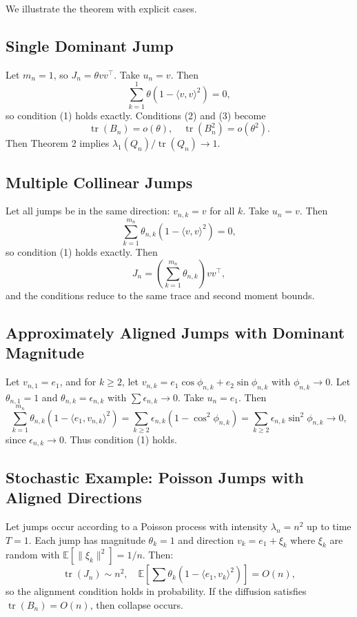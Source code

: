 \documentclass{article}
\begin{document}
We illustrate the theorem with explicit cases.

\subsection{Single Dominant Jump}

Let \(m_n = 1\), so \(J_n = \theta v v^\top\). Take \(u_n = v\). Then
\[
\sum_{k=1}^{1} \theta (1 - \langle v, v \rangle^2) = 0,
\]
so condition (1) holds exactly. Conditions (2) and (3) become
\[
\operatorname{tr}(B_n) = o(\theta), \quad \operatorname{tr}(B_n^2) = o(\theta^2).
\]
Then Theorem 2 implies \(\lambda_1(Q_n)/\operatorname{tr}(Q_n) \to 1\).

\subsection{Multiple Collinear Jumps}

Let all jumps be in the same direction: \(v_{n,k} = v\) for all \(k\). Take \(u_n = v\). Then
\[
\sum_{k=1}^{m_n} \theta_{n,k} (1 - \langle v, v \rangle^2) = 0,
\]
so condition (1) holds exactly. Then
\[
J_n = \left(\sum_{k=1}^{m_n} \theta_{n,k}\right) v v^\top,
\]
and the conditions reduce to the same trace and second moment bounds.

\subsection{Approximately Aligned Jumps with Dominant Magnitude}

Let \(v_{n,1} = e_1\), and for \(k \ge 2\), let \(v_{n,k} = e_1 \cos \phi_{n,k} + e_2 \sin \phi_{n,k}\) with \(\phi_{n,k} \to 0\). Let \(\theta_{n,1} = 1\) and \(\theta_{n,k} = \epsilon_{n,k}\) with \(\sum \epsilon_{n,k} \to 0\). Take \(u_n = e_1\). Then
\[
\sum_{k=1}^{m_n} \theta_{n,k} (1 - \langle e_1, v_{n,k} \rangle^2) = \sum_{k \ge 2} \epsilon_{n,k} (1 - \cos^2 \phi_{n,k}) = \sum_{k \ge 2} \epsilon_{n,k} \sin^2 \phi_{n,k} \to 0,
\]
since \(\epsilon_{n,k} \to 0\). Thus condition (1) holds.

\subsection{Stochastic Example: Poisson Jumps with Aligned Directions}

Let jumps occur according to a Poisson process with intensity \(\lambda_n = n^2\) up to time \(T=1\). Each jump has magnitude \(\theta_k = 1\) and direction \(v_k = e_1 + \xi_k\) where \(\xi_k\) are random with \(\mathbb{E}[\|\xi_k\|^2] = 1/n\). Then:
\[
\operatorname{tr}(J_n) \sim n^2, \quad \mathbb{E}\left[\sum \theta_k (1 - \langle e_1, v_k \rangle^2)\right] = O(n),
\]
so the alignment condition holds in probability. If the diffusion satisfies \(\operatorname{tr}(B_n) = O(n)\), then collapse occurs.
\end{document}
